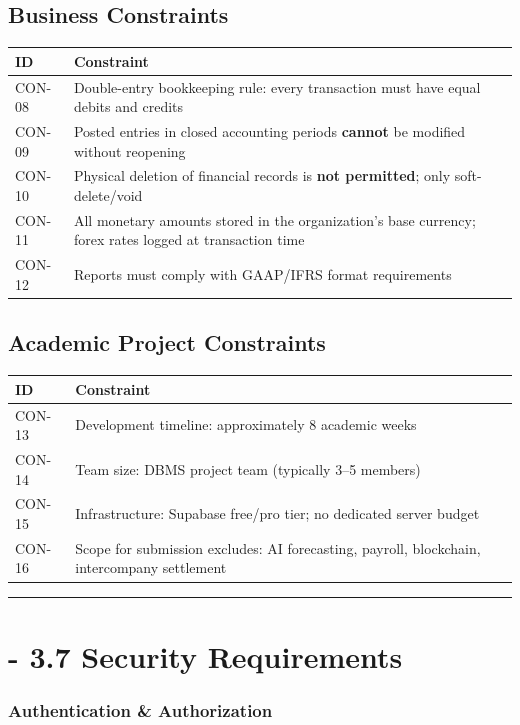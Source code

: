\documentclass[journal, a4paper, onecolumn, 12pt]{IEEEtran}
\begin{document}
\subsection{Business Constraints}
\begin{longtable}{|p{}|p{}|}
\hline
ID & Constraint \\ \hline
\hline
CON-08 & Double-entry bookkeeping rule: every transaction must have equal debits and credits \\ \hline
CON-09 & Posted entries in closed accounting periods \textbf{cannot} be modified without reopening \\ \hline
CON-10 & Physical deletion of financial records is \textbf{not permitted}; only soft-delete/void \\ \hline
CON-11 & All monetary amounts stored in the organization's base currency; forex rates logged at transaction time \\ \hline
CON-12 & Reports must comply with GAAP/IFRS format requirements \\ \hline
\end{longtable}
\subsection{Academic Project Constraints}
\begin{longtable}{|p{}|p{}|}
\hline
ID & Constraint \\ \hline
\hline
CON-13 & Development timeline: approximately 8 academic weeks \\ \hline
CON-14 & Team size: DBMS project team (typically 3–5 members) \\ \hline
CON-15 & Infrastructure: Supabase free/pro tier; no dedicated server budget \\ \hline
CON-16 & Scope for submission excludes: AI forecasting, payroll, blockchain, intercompany settlement \\ \hline
\end{longtable}
\vspace{1em}\hrule\vspace{1em}

\section{    - 3.7 Security Requirements}

\subsubsection{Authentication \& Authorization}
\end{document}
